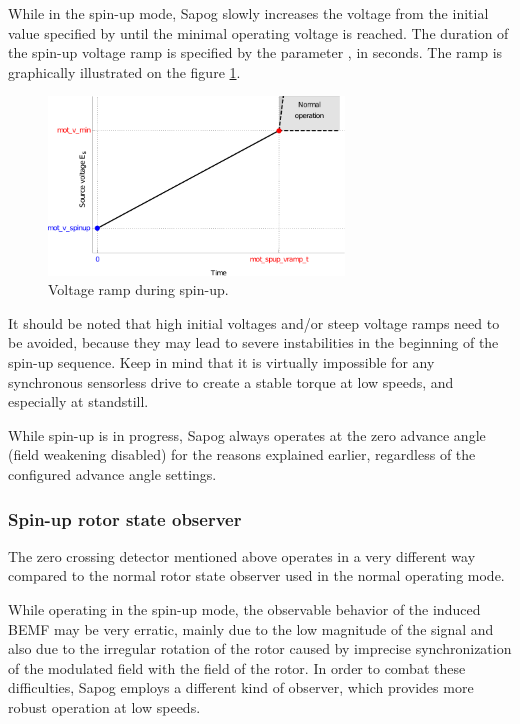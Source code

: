 \documentclass{zubaxdoc}
\begin{document}
While in the spin-up mode, Sapog slowly increases the voltage from the initial value specified
by  until the minimal operating voltage  is reached.
The duration of the spin-up voltage ramp is specified by the parameter ,
in seconds.
The ramp is graphically illustrated on the figure \ref{spinup_voltage_ramp}.

\begin{figure}[hbt]
    \centering
	\includegraphics[width=0.7\textwidth]{spinup_voltage_ramp}
	\caption{Voltage ramp during spin-up.
	\label{spinup_voltage_ramp}}
\end{figure}

It should be noted that high initial voltages and/or steep voltage ramps need to be avoided,
because they may lead to severe instabilities in the beginning of the spin-up sequence.
Keep in mind that it is virtually impossible for any synchronous sensorless drive to create a stable
torque at low speeds, and especially at standstill.

While spin-up is in progress, Sapog always operates at the zero advance angle
(field weakening disabled) for the reasons explained earlier,
regardless of the configured advance angle settings.

\subsubsection{Spin-up rotor state observer}

The zero crossing detector mentioned above operates in a very different way compared to the
normal rotor state observer used in the normal operating mode.

While operating in the spin-up mode, the observable behavior of the induced BEMF may be very erratic,
mainly due to the low magnitude of the signal and also due to the irregular rotation of the rotor caused by
imprecise synchronization of the modulated field with the field of the rotor.
In order to combat these difficulties, Sapog employs a different kind of observer, which provides
more robust operation at low speeds.
\end{document}
